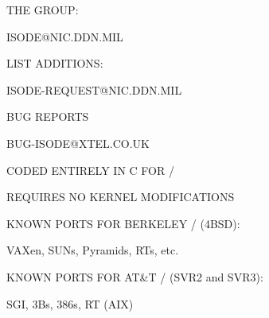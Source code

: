 \begin{bwslide}

\begin{nrtc}
\item	THE GROUP:
    \begin{nrtc}
    \item	ISODE@NIC.DDN.MIL
    \end{nrtc}

\item	LIST ADDITIONS:
    \begin{nrtc}
    \item	ISODE-REQUEST@NIC.DDN.MIL
    \end{nrtc}

\item	BUG REPORTS
    \begin{nrtc}
    \item	BUG-ISODE@XTEL.CO.UK
    \end{nrtc}
\end{nrtc}
\end{bwslide}


\begin{bwslide}

\begin{nrtc}
\item	CODED ENTIRELY IN C FOR \unix/
    \begin{nrtc}
    \item	REQUIRES NO KERNEL MODIFICATIONS    
    \end{nrtc}

\item	KNOWN PORTS FOR BERKELEY \unix/ (4BSD):
    \begin{nrtc}
    \item	VAXen, SUNs, Pyramids, RTs, etc.
    \end{nrtc}

\item	KNOWN PORTS FOR AT\&T \unix/ (SVR2 and SVR3):
    \begin{nrtc}
    \item	SGI, 3Bs, 386s, RT (AIX)
    \end{nrtc}
\end{nrtc}
\end{bwslide}
